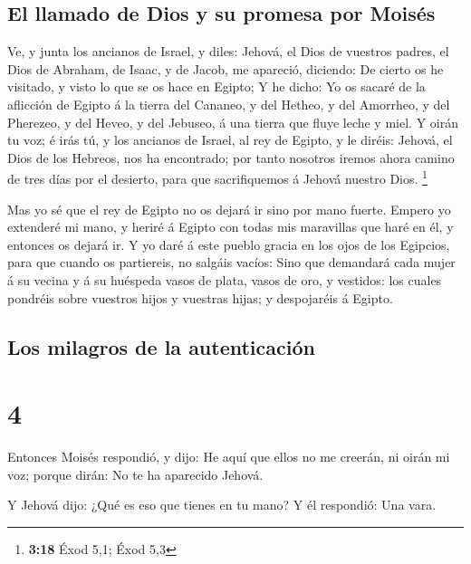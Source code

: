 \hypertarget{el-llamado-de-dios-y-su-promesa-por-moisuxe9s}{%
\subsection{El llamado de Dios y su promesa por
Moisés}\label{el-llamado-de-dios-y-su-promesa-por-moisuxe9s}}

 Ve, y junta los ancianos de Israel, y diles: Jehová, el
Dios de vuestros padres, el Dios de Abraham, de Isaac, y de Jacob, me
apareció, diciendo: De cierto os he visitado, y visto lo que se os hace
en Egipto;  Y he dicho: Yo os sacaré de la aflicción de
Egipto á la tierra del Cananeo, y del Hetheo, y del Amorrheo, y del
Pherezeo, y del Heveo, y del Jebuseo, á una tierra que fluye leche y
miel.  Y oirán tu voz; é irás tú, y los ancianos de Israel,
al rey de Egipto, y le diréis: Jehová, el Dios de los Hebreos, nos ha
encontrado; por tanto nosotros iremos ahora camino de tres días por el
desierto, para que sacrifiquemos á Jehová nuestro Dios. \footnote{\textbf{3:18}
  Éxod 5,1; Éxod 5,3}

 Mas yo sé que el rey de Egipto no os dejará ir sino por
mano fuerte.  Empero yo extenderé mi mano, y heriré á
Egipto con todas mis maravillas que haré en él, y entonces os dejará ir.
 Y yo daré á este pueblo gracia en los ojos de los
Egipcios, para que cuando os partiereis, no salgáis vacíos:
 Sino que demandará cada mujer á su vecina y á su huéspeda
vasos de plata, vasos de oro, y vestidos: los cuales pondréis sobre
vuestros hijos y vuestras hijas; y despojaréis á Egipto.

\hypertarget{los-milagros-de-la-autenticaciuxf3n}{%
\subsection{Los milagros de la
autenticación}\label{los-milagros-de-la-autenticaciuxf3n}}

\hypertarget{section-3}{%
\section{4}\label{section-3}}

 Entonces Moisés respondió, y dijo: He aquí que ellos no me
creerán, ni oirán mi voz; porque dirán: No te ha aparecido Jehová.

 Y Jehová dijo: ¿Qué es eso que tienes en tu mano? Y él
respondió: Una vara.

